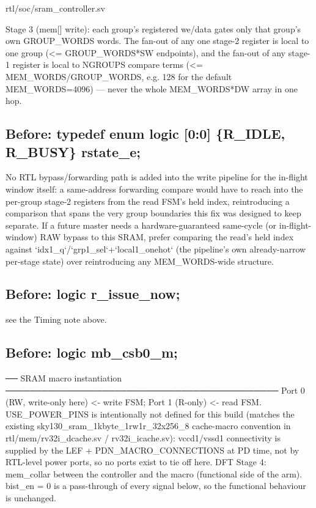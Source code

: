\begin{relocated}{rtl/soc/sram_controller.sv}
\begin{textblock}
  Stage 3 (mem[] write): each group's registered we/data gates only
  that group's own GROUP_WORDS words. The fan-out of any one stage-2
  register is local to one group (<= GROUP_WORDS*SW endpoints), and
  the fan-out of any stage-1 register is local to NGROUPS compare
  terms (<= MEM_WORDS/GROUP_WORDS, e.g. 128 for the default
  MEM_WORDS=4096) — never the whole MEM_WORDS*DW array in one hop.
\end{textblock}

\subsection*{Before: typedef enum logic [0:0] \{R\_IDLE, R\_BUSY\} rstate\_e;}

\begin{textblock}
No RTL bypass/forwarding path is added into the write pipeline for
the in-flight window itself: a same-address forwarding compare would
have to reach into the per-group stage-2 registers from the read
FSM's held index, reintroducing a comparison that spans the very
group boundaries this fix was designed to keep separate. If a future
master needs a hardware-guaranteed same-cycle (or in-flight-window)
RAW bypass to this SRAM, prefer comparing the read's held index
against `idx1_q`/`grp1_sel`+`local1_onehot` (the pipeline's own
already-narrow per-stage state) over reintroducing any MEM_WORDS-wide
structure.
\end{textblock}

\subsection*{Before: logic r\_issue\_now;}

\begin{textblock}
see the Timing note above.
\end{textblock}

\subsection*{Before: logic             mb\_csb0\_m;}

\begin{textblock}
── SRAM macro instantiation ─────────────────────────────────────────────
Port 0 (RW, write-only here) <- write FSM; Port 1 (R-only) <- read FSM.
USE_POWER_PINS is intentionally not defined for this build (matches the
existing sky130_sram_1kbyte_1rw1r_32x256_8 cache-macro convention in
rtl/mem/rv32i_dcache.sv / rv32i_icache.sv): vccd1/vssd1 connectivity is
supplied by the LEF + PDN_MACRO_CONNECTIONS at PD time, not by RTL-level
power ports, so no ports exist to tie off here.
DFT Stage 4: mem_collar between the controller and the macro (functional side of the arm).
bist_en = 0 is a pass-through of every signal below, so the functional behaviour is unchanged.
\end{textblock}


\end{relocated}
